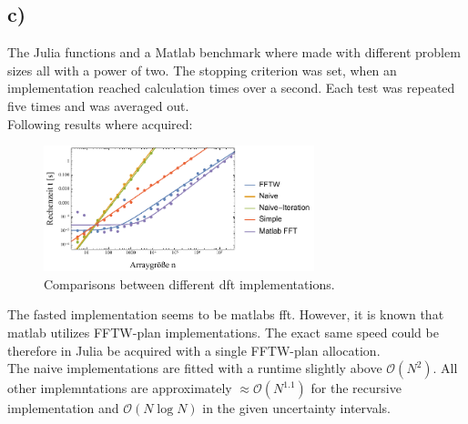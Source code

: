 \documentclass[12pt,a4paper]{article}
\begin{document}
	\subsection*{c)}
		The Julia functions and a Matlab benchmark where made with different problem sizes
		all with a power of two. The stopping criterion was set, when an implementation
		reached calculation times over a second. Each test was repeated five times and
		was averaged out.\\
		Following results where acquired:
		\begin{figure}[H]
			\centering
			\includegraphics[width=0.7\textwidth]{A2/data/Comparison.pdf}
			\caption[]{Comparisons between different dft implementations.}
		\end{figure}
		The fasted implementation seems to be matlabs fft. However, it is known
		that matlab utilizes FFTW-plan implementations. The exact same speed could
		be therefore in Julia be acquired with a single FFTW-plan allocation.\\
		The naive implementations are fitted with a runtime slightly above
		\(\mathcal{O}\left(N^2\right)\). All other implemntations are approximately
		\(\approx\mathcal{O}\left(N^{1.1}\right)\) for the recursive implementation
		and \(\mathcal{O}\left(N\log N\right)\) in the given uncertainty intervals.
\end{document}
